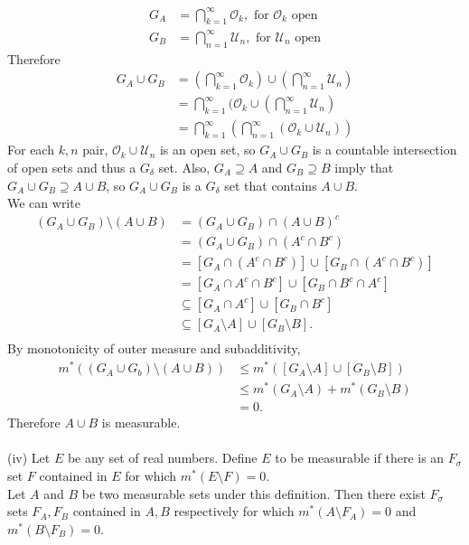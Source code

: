 \begin{enumerate}
	\begin{align*}
		G_A &= \bigcap_{k=1}^\infty \mathcal{O}_k,\text{ for }\mathcal{O}_k\text{ open}\\
		G_B &= \bigcap_{n=1}^\infty \mathcal{U}_n,\text{ for }\mathcal{U}_n\text{ open}
	\end{align*}
	Therefore 
	\begin{align*}
		G_A\cup G_B&=(\bigcap_{k=1}^\infty \mathcal{O}_k)\cup(\bigcap_{n=1}^\infty \mathcal{U}_n)\\
		&=\bigcap_{k=1}^\infty (\mathcal{O}_k\cup(\bigcap_{n=1}^\infty \mathcal{U}_n)\\
		&=\bigcap_{k=1}^\infty (\bigcap_{n=1}^\infty(\mathcal{O}_k\cup \mathcal{U}_n))
	\end{align*}
	For each $k,n$ pair, $\mathcal{O}_k\cup \mathcal{U}_n$ is an open set, so $G_A\cup G_B$ is a countable intersection of open sets and thus a $G_\delta$ set.
	Also, $G_A\supseteq A$ and $G_B\supseteq B$ imply that $G_A\cup G_B\supseteq A\cup B$, so $G_A\cup G_B$ is a $G_\delta$ set that contains $A\cup B$.\\
	We can write
	\begin{align*}
		(G_A\cup G_B)\setminus(A\cup B)&=(G_A\cup G_B)\cap(A\cup B)^c\\
		&=(G_A\cup G_B)\cap(A^c\cap B^c)\\
		&=[G_A\cap(A^c\cap B^c)]\cup[G_B\cap(A^c\cap B^c)]\\
		&=[G_A\cap A^c\cap B^c]\cup[G_B\cap B^c\cap A^c]\\
		&\subseteq[G_A\cap A^c]\cup[G_B\cap B^c]\\
		&\subseteq[G_A\setminus A]\cup[G_B\setminus B].\\
	\end{align*}
	By monotonicity of outer measure and subadditivity, 
	\begin{align*}
		m^*((G_A\cup G_b)\setminus(A\cup B))&\le m^*([G_A\setminus A]\cup[G_B\setminus B])\\
		&\le m^*(G_A\setminus A)+m^*(G_B\setminus B)\\
		&=0.
	\end{align*}
	Therefore $A\cup B$ is measurable.\\
	\\(iv) Let $E$ be any set of real numbers. Define $E$ to be measurable if there is an $F_\sigma$ set $F$ contained in $E$ for which $m^*(E\setminus F)=0$.\\
	Let $A$ and $B$ be two measurable sets under this definition.
	Then there exist $F_\sigma$ sets $F_A,F_B$ contained in $A,B$ respectively for which $m^*(A\setminus F_A)=0$ and $m^*(B\setminus F_B)=0$.\\

\end{enumerate}
